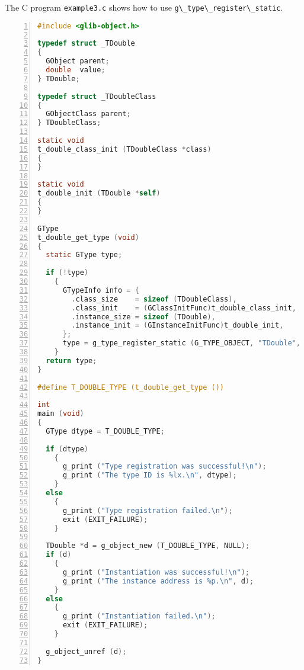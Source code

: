 The C program \passthrough{\lstinline!example3.c!} shows how to use
\passthrough{\lstinline!g\_type\_register\_static!}.

\begin{lstlisting}[language=C, numbers=left]
#include <glib-object.h>

typedef struct _TDouble
{
  GObject parent;
  double  value;
} TDouble;

typedef struct _TDoubleClass
{
  GObjectClass parent;
} TDoubleClass;

static void
t_double_class_init (TDoubleClass *class)
{
}

static void
t_double_init (TDouble *self)
{
}

GType
t_double_get_type (void)
{
  static GType type;

  if (!type)
    {
      GTypeInfo info = {
        .class_size    = sizeof (TDoubleClass),
        .class_init    = (GClassInitFunc)t_double_class_init,
        .instance_size = sizeof (TDouble),
        .instance_init = (GInstanceInitFunc)t_double_init,
      };
      type = g_type_register_static (G_TYPE_OBJECT, "TDouble", &info, G_TYPE_FLAG_NONE);
    }
  return type;
}

#define T_DOUBLE_TYPE (t_double_get_type ())

int
main (void)
{
  GType dtype = T_DOUBLE_TYPE;

  if (dtype)
    {
      g_print ("Type registration was successful!\n");
      g_print ("The type ID is %lx.\n", dtype);
    }
  else
    {
      g_print ("Type registration failed.\n");
      exit (EXIT_FAILURE);
    }

  TDouble *d = g_object_new (T_DOUBLE_TYPE, NULL);
  if (d)
    {
      g_print ("Instantiation was successful!\n");
      g_print ("The instance address is %p.\n", d);
    }
  else
    {
      g_print ("Instantiation failed.\n");
      exit (EXIT_FAILURE);
    }

  g_object_unref (d);
}
\end{lstlisting}

